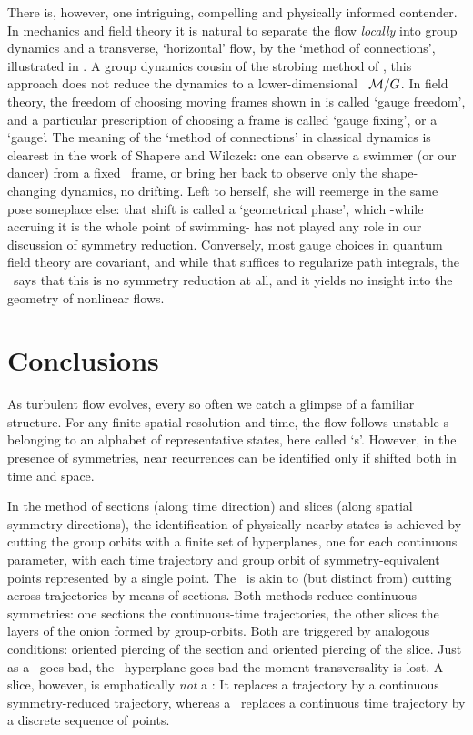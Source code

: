 \documentclass[aip,cha,reprint,
secnumarabic,
nofootinbib, tightenlines,
nobibnotes, showkeys, showpacs,
groupedaddress
]{revtex4-1}
\begin{document}
There is, however, one intriguing, compelling  and physically informed
contender. In mechanics and field theory it is natural to separate the
flow {\em locally} into group dynamics and a transverse, `horizontal'
flow, by the `method of
connections', illustrated in
. A group dynamics cousin of the strobing method
of , this approach does not reduce the dynamics to a
lower-dimensional \reducedsp\ ${\cal M}/G$. In field theory, the freedom
of choosing moving frames shown in  is called
`gauge freedom', and a particular prescription of choosing a frame is
called `gauge fixing', or a `gauge'. The meaning of the `method of
connections' in classical dynamics is clearest in the work of Shapere
and Wilczek: one can observe a swimmer (or our dancer)
from a fixed \slice\ frame, or bring her back to observe only the
shape-changing dynamics, no drifting. Left to herself, she will reemerge
in the same pose someplace else: that shift is called a `geometrical
phase', which -while accruing it is the whole point of swimming- has not
played any role in our discussion of symmetry reduction. Conversely, most
gauge choices in quantum field theory are covariant, and while that
suffices to regularize path integrals, the \mslices\ says that this is no
symmetry reduction at all, and it yields no insight into the geometry of
nonlinear flows.



\section{Conclusions}
\label{s:concl}

As turbulent flow evolves, every so often we catch a glimpse of a
familiar structure. For any finite spatial resolution and time, the flow
follows  unstable {\cohStr s} belonging to an alphabet of representative
states, here called `\template s'. However, in the presence of
symmetries, near recurrences can be identified only if shifted both in
time and space.

In the method of sections (along time direction) and slices (along
spatial symmetry directions), the identification of physically nearby
states is achieved by cutting the group orbits with a finite set of
hyperplanes, one for each continuous parameter, with each time trajectory
and group orbit of symmetry-equivalent points represented by a single
point. The \mslices\ is akin to (but distinct
from) cutting across trajectories by means of sections. Both methods
reduce continuous symmetries: one sections the continuous-time
trajectories, the other slices the layers of the onion formed by
group-orbits. Both are triggered by analogous conditions: oriented
piercing of the section and oriented piercing of the slice. Just as a
\PoincSec\ goes bad, the \slice\ hyperplane goes bad the moment
transversality is lost. A slice, however, is emphatically \emph{not} a
\PoincSec: It replaces a trajectory by a continuous symmetry-reduced
trajectory, whereas a \PoincSec\ replaces a continuous time trajectory by
a discrete sequence of points.
\end{document}
